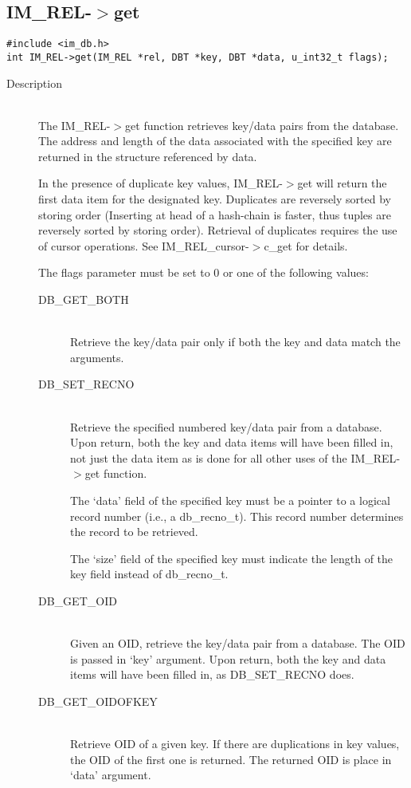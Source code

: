 \documentclass[11pt]{article}
\def\cdf{\sf }
\def\cdf{\sf }
\newcommand{\IMREL}{{\small{\cdf IM\_REL}}}
\newcommand{\IMRELcursor}{{\small{\cdf IM\_REL\_cursor}}}
\newcommand{\DBGETBOTH}{{\small{\cdf DB\_GET\_BOTH}}}
\newcommand{\DBSETRECNO}{{\small{\cdf DB\_SET\_RECNO}}}
\newcommand{\DBGETOIDOFKEY}{{\small{\cdf DB\_GET\_OIDOFKEY}}}
\newcommand{\DBGETOID}{{\small{\cdf DB\_GET\_OID}}}
\newcommand{\dbrecnot}{{\small{\cdf db\_recno\_t}}}
\begin{document}
\subsection{{\IMREL}-$>$get}
\begin{verbatim}
#include <im_db.h>
int IM_REL->get(IM_REL *rel, DBT *key, DBT *data, u_int32_t flags);
\end{verbatim}
\begin{description}
\item[Description]\ \\
  The {\IMREL}-$>$get function retrieves key/data pairs from the database. The
  address and length of the data associated with the specified key are
  returned in the structure referenced by data.

  In the presence of duplicate key values, {\IMREL}-$>$get will return the
  first data item for the designated key. Duplicates are reversely
  sorted by storing order (Inserting at head of a hash-chain is
  faster, thus tuples are reversely sorted by storing order).
  Retrieval of duplicates requires the use of cursor operations. See
  {\IMRELcursor}-$>$c\_get for details.

  The flags parameter must be set to 0 or one of the following values: 
  \begin{description}
  \item[{\DBGETBOTH}]\ \\
    Retrieve the key/data pair only if both the key and data match the
    arguments.
  \item[{\DBSETRECNO}]\ \\
    Retrieve the specified numbered key/data pair from a
    database. Upon return, both the key and data items will have been
    filled in, not just the data item as is done for all other uses of
    the {\IMREL}-$>$get function.

    The `data' field of the specified key must be a pointer to a
    logical record number (i.e., a {\dbrecnot}). This record number
    determines the record to be retrieved.

    The `size' field of the specified key must indicate the length of
    the key field instead of {\dbrecnot}.
  \item[{\DBGETOID}]\ \\
    Given an OID, retrieve the key/data pair from a database.  The OID
    is passed in `key' argument.  Upon return, both the key and data
    items will have been filled in, as {\DBSETRECNO} does.
  \item[{\DBGETOIDOFKEY}]\ \\
    Retrieve OID of a given key.  If there are duplications in key
    values, the OID of the first one is returned.  The returned OID is
    place in `data' argument.
  \end{description}
  

\end{description}
\end{document}
